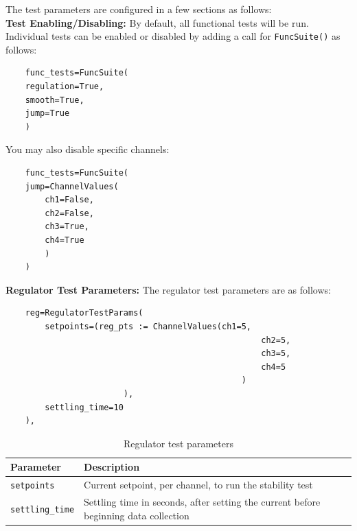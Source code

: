 
\newpage

\medskip
{}
\par\medskip
The test parameters are configured in a few sections as follows:\\
\noindent\normalsize\textbf{Test Enabling/Disabling:} By default, all functional tests will be run. Individual tests can be enabled or disabled by adding a call for \texttt{FuncSuite()} as follows:
\begin{verbatim}
	func_tests=FuncSuite(
	regulation=True,
	smooth=True,
	jump=True
	)
\end{verbatim}
\medskip
You may also disable specific channels: 
\begin{verbatim}
	func_tests=FuncSuite(
	jump=ChannelValues(
		ch1=False,
		ch2=False,
		ch3=True,
		ch4=True
		)
	)
\end{verbatim}

\medskip

\noindent\normalsize\textbf{Regulator Test Parameters:} The regulator test parameters are as follows:
\begin{verbatim}
	reg=RegulatorTestParams(
		setpoints=(reg_pts := ChannelValues(ch1=5,
                                                    ch2=5,
                                                    ch3=5,
                                                    ch4=5
	                                            )
	                    ),
		settling_time=10
	),
\end{verbatim}
\begin{table}[ht]
	\centering
	\begin{tabular}{p{4cm}p{10cm}}
		\toprule
		\textbf{Parameter} & \textbf{Description} \\
		\midrule
		
		\texttt{setpoints} &
		Current setpoint, per channel, to run the stability test\\
		
		\texttt{settling\_time} &
		Settling time in seconds, after setting the current before beginning data collection\\

		\bottomrule
	\end{tabular}
	\caption{Regulator test parameters}
	\label{tab:regulator-test-parameters}
\end{table}